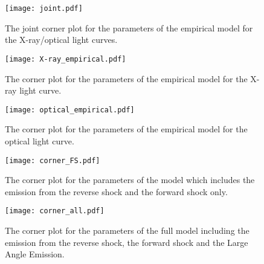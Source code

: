 \documentclass{naturesubmissionstyle}
\begin{document}
\newpage 

\begin{figure}[ht!]
    \centering
    \texttt{[image: joint.pdf]}
    \caption{The joint corner plot for the parameters of the empirical model for the X-ray/optical light curves.
    }
    \label{joint_contour}
\end{figure}

\newpage

\begin{figure}[ht!]
    \centering
    \texttt{[image: X-ray\_empirical.pdf]}
    \caption{The corner plot for the parameters of the empirical model for the X-ray light curve.
    }
    \label{X-ray_empirical}
\end{figure}

\newpage

\begin{figure}[ht!]
    \centering
    \texttt{[image: optical\_empirical.pdf]}
    \caption{The corner plot for the parameters of the empirical model for the optical light curve.
    }
    \label{optical_empirical}
\end{figure}

\newpage 

\begin{figure}[ht!]
    \centering
    \texttt{[image: corner\_FS.pdf]}
    \caption{The corner plot for the parameters of the model which includes the emission from the reverse shock and the forward shock only.
    }
    \label{all}
\end{figure}

\newpage 

\begin{figure}[ht!]
    \centering
    \texttt{[image: corner\_all.pdf]}
    \caption{The corner plot for the parameters of the full model including the emission from the reverse shock, the forward shock and the Large Angle Emission.
    }
    \label{all}
\end{figure}

\newpage 


\end{document}

